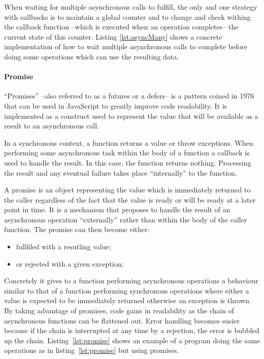 When waiting for multiple asynchronous calls to fulfill, the only and one strategy with callbacks is to maintain a global counter and to change and check withing the callback function --which is executed when an operation completes-- the current state of this counter. Listing \ref{lst:asyncMany} shows a concrete implementation of how to wait multiple asynchronous calls to complete before doing some operations which can use the resulting data.

\paragraph{Promise}

``Promises'' --also referred to as a futures or a defers-- is a pattern coined in 1976~\cite{Friedman1976} that can be used in JavaScript to greatly improve code readability. It is implemented as a construct used to represent the value that will be available as a result to an asynchronous call.

In a synchronous context, a function returns a value or throw exceptions. When performing some asynchronous task within the body of a function a callback is used to handle the result. In this case, the function returns nothing. Processing the result and any eventual failure takes place ``internally'' to the function.

A promise is an object representing the value which is immediately returned to the caller regardless of the fact that the value is ready or will be ready at a later point in time. It is a mechanism that proposes to handle the result of an asynchronous operation ``externally'' rather than within the body of the caller function. The promise can then become either:
\begin{itemize}
    \item fullfiled with a resutling value;
    \item or rejected with a given exception;
\end{itemize}

Concretely it gives to a function performing asynchronous operations a behaviour similar to that of a function performing synchronous operations where either a value is expected to be immediately returned otherwise an exception is thrown. By taking advantage of promises, code gains in readability as the chain of asynchronous functions can be flattened out. Error handling becomes easier because if the chain is interrupted at any time by a rejection, the error is bubbled up the chain. Listing~\ref{lst:promise} shows an example of a program doing the same operations as in listing~\ref{lst:promise} but using promises.

